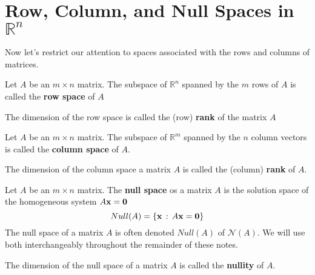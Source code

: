 \section{Row, Column, and Null Spaces in $\mathbb{R}^n$}
Now let's restrict our attention to spaces associated with the rows and columns of
matrices. 
\begin{definition}
        Let $A$ be an $m \times n$ matrix. The subspace of $\mathbb{R}^n$ spanned by the
        $m$ rows of $A$ is called the {\bf row space} of $A$
\end{definition}

\begin{definition}
    The dimension of the row space is called the (row) {\bf rank} of the matrix $A$
\end{definition}

\begin{definition}
        Let $A$ be an $m \times n$ matrix. The subspace of $\mathbb{R}^m$ spanned by the
        $n$ column vectors is called the {\bf column space} of $A$.
\end{definition}

\begin{definition}
    The dimension of the column space a matrix $A$ is called the (column) {\bf rank} of $A$.
\end{definition}

\begin{definition}
        Let $A$ be an $m \times n$ matrix.  The {\bf null space} os a matrix $A$ is the
        solution space of the homogeneous system $A {\bf x} = {\bf 0}$ 
        \[ Null(A) = \{ {\bf x} \, : \,
        A{\bf x} = {\bf 0} \} \]
        The null space of a matrix $A$ is often denoted $Null(A)$ of $\mathcal{N}(A)$.  We
        will use both interchangeably throughout the remainder of these notes.
\end{definition}

\begin{definition}
    The dimension of the null space of a matrix $A$ is called the {\bf nullity} of $A$.
\end{definition}

